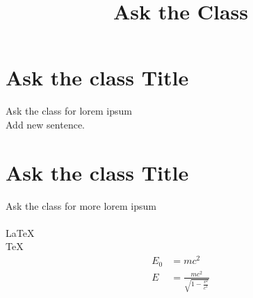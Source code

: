 \documentclass[12pt]{article}
\begin{document}
	\title{   Ask the Class }
	\maketitle

	\section{ Ask the class Title }
	Ask the class for lorem ipsum\\
	Add new sentence.

	\section{Ask the class Title}
	Ask the class for more lorem ipsum\\
	\\
	
	\LaTeX{}\\
	\TeX{}\\

	\begin{align}
		E_0 &= mc^2 \\
		E &= \frac{mc^2}{\sqrt{1-\frac{v^2}{c^2}}}\\
	\end{align}
\end{document}
